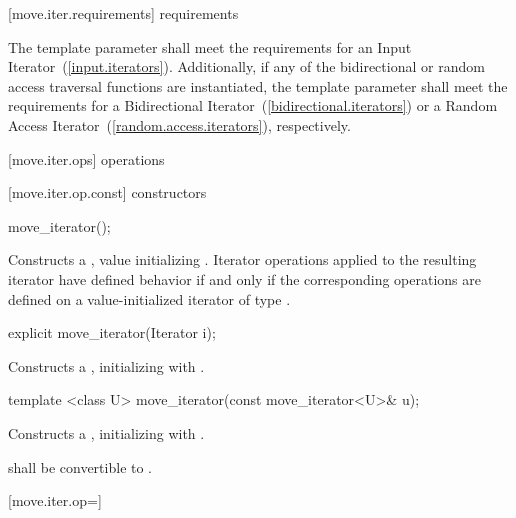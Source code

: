 [move.iter.requirements]{ requirements}

\pnum
The template parameter  shall meet
the requirements for an Input Iterator~(\ref{input.iterators}).
Additionally, if any of the bidirectional or random access traversal
functions are instantiated, the template parameter shall meet the
requirements for a Bidirectional Iterator~(\ref{bidirectional.iterators})
or a Random Access Iterator~(\ref{random.access.iterators}), respectively.

[move.iter.ops]{ operations}

[move.iter.op.const]{ constructors}

%
\begin{itemdecl}
move_iterator();
\end{itemdecl}

\begin{itemdescr}
\pnum
\effects Constructs a , value
initializing . Iterator operations applied to the resulting
iterator have defined behavior if and only if the corresponding operations are defined
on a value-initialized iterator of type .
\end{itemdescr}


%
\begin{itemdecl}
explicit move_iterator(Iterator i);
\end{itemdecl}

\begin{itemdescr}
\pnum
\effects Constructs a , initializing
 with .
\end{itemdescr}


%
\begin{itemdecl}
template <class U> move_iterator(const move_iterator<U>& u);
\end{itemdecl}

\begin{itemdescr}
\pnum
\effects Constructs a , initializing
 with .

\pnum
\requires {} shall be convertible to
.
\end{itemdescr}

[move.iter.op=]{}


